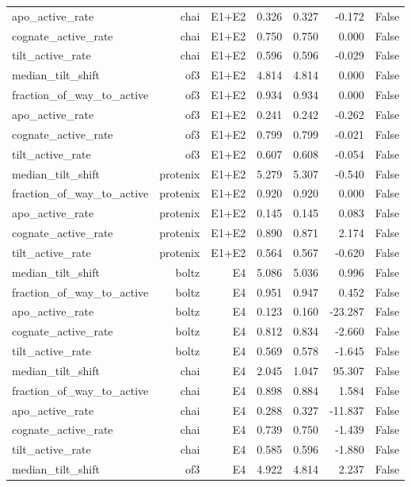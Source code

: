 \begin{table}[htbp]
\begin{tabular}{lrrrrrr}
apo\_active\_rate & chai & E1+E2 & 0.326 & 0.327 & -0.172 & False \\
cognate\_active\_rate & chai & E1+E2 & 0.750 & 0.750 & 0.000 & False \\
tilt\_active\_rate & chai & E1+E2 & 0.596 & 0.596 & -0.029 & False \\
median\_tilt\_shift & of3 & E1+E2 & 4.814 & 4.814 & 0.000 & False \\
fraction\_of\_way\_to\_active & of3 & E1+E2 & 0.934 & 0.934 & 0.000 & False \\
apo\_active\_rate & of3 & E1+E2 & 0.241 & 0.242 & -0.262 & False \\
cognate\_active\_rate & of3 & E1+E2 & 0.799 & 0.799 & -0.021 & False \\
tilt\_active\_rate & of3 & E1+E2 & 0.607 & 0.608 & -0.054 & False \\
median\_tilt\_shift & protenix & E1+E2 & 5.279 & 5.307 & -0.540 & False \\
fraction\_of\_way\_to\_active & protenix & E1+E2 & 0.920 & 0.920 & 0.000 & False \\
apo\_active\_rate & protenix & E1+E2 & 0.145 & 0.145 & 0.083 & False \\
cognate\_active\_rate & protenix & E1+E2 & 0.890 & 0.871 & 2.174 & False \\
tilt\_active\_rate & protenix & E1+E2 & 0.564 & 0.567 & -0.620 & False \\
median\_tilt\_shift & boltz & E4 & 5.086 & 5.036 & 0.996 & False \\
fraction\_of\_way\_to\_active & boltz & E4 & 0.951 & 0.947 & 0.452 & False \\
apo\_active\_rate & boltz & E4 & 0.123 & 0.160 & -23.287 & False \\
cognate\_active\_rate & boltz & E4 & 0.812 & 0.834 & -2.660 & False \\
tilt\_active\_rate & boltz & E4 & 0.569 & 0.578 & -1.645 & False \\
median\_tilt\_shift & chai & E4 & 2.045 & 1.047 & 95.307 & False \\
fraction\_of\_way\_to\_active & chai & E4 & 0.898 & 0.884 & 1.584 & False \\
apo\_active\_rate & chai & E4 & 0.288 & 0.327 & -11.837 & False \\
cognate\_active\_rate & chai & E4 & 0.739 & 0.750 & -1.439 & False \\
tilt\_active\_rate & chai & E4 & 0.585 & 0.596 & -1.880 & False \\
median\_tilt\_shift & of3 & E4 & 4.922 & 4.814 & 2.237 & False \\

\end{tabular}
\end{table}
